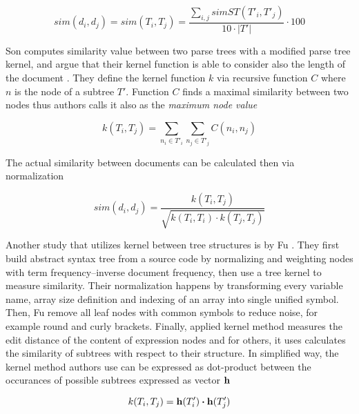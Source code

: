 \begin{equation}
    sim(d_i, d_j) = sim(T_i, T_j) = \dfrac{\sum\limits_{i, j}simST(T'_i, T'_j)}{10 \cdot |T'|} \cdot 100
\end{equation}

\noindent
Son \etal computes similarity value between two parse trees with a modified parse tree kernel, and argue that their kernel function is able to consider also the length of the document \cite{AAPSCDPTK2013}. They define the kernel function $k$ via recursive function $C$ where $n$ is the node of a subtree $T'$. Function $C$ finds a maximal similarity between two nodes thus authors calls it also as the \emph{maximum node value}  

\begin{equation}
    k(T_i, T_j) = \sum\limits_{n_i \in T'_i} \sum\limits_{n_j \in T'_j} C(n_i, n_j)
\end{equation}

\noindent
The actual similarity between documents can be calculated then via normalization \cite{AAPSCDPTK2013}

\begin{equation}\label{norm_kern_eqn}
    sim(d_i, d_j) = \dfrac{k(T_i, T_j)}{\sqrt{k(T_i, T_i) \cdot k(T_j, T_j)}}
\end{equation}


\noindent
Another study that utilizes kernel between tree structures is by Fu \etal \cite{Fu2017WASTKAW}. They first build abstract syntax tree from a source code by normalizing and weighting nodes with term frequency–inverse document frequency, then use a tree kernel to measure similarity. Their normalization happens by transforming every variable name, array size definition and indexing of an array into single unified symbol. Then, Fu \etal remove all leaf nodes with common symbols to reduce noise, for example round and curly brackets. Finally, applied kernel method measures the edit distance of the content of expression nodes and for others, it uses calculates the similarity of subtrees with respect to their structure. In simplified way, the kernel method authors use can be expressed as dot-product between the occurances of possible subtrees expressed as vector $\mathbf{h}$ \cite{Fu2017WASTKAW}

\begin{equation}
    k(T_i, T_j) = \mathbf{h}(T_i') \boldsymbol{\cdot} \mathbf{h}(T_j')
\end{equation}

